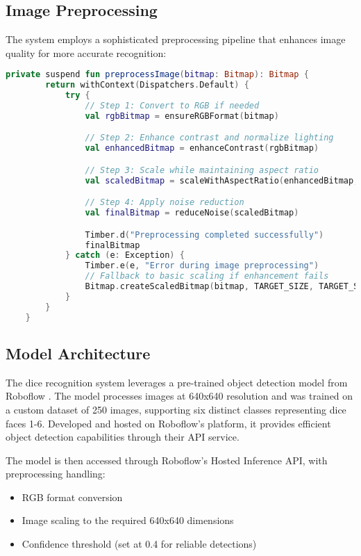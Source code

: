 \subsection{Image Preprocessing}

The system employs a sophisticated preprocessing pipeline that enhances image quality for more accurate recognition:
\begin{lstlisting}[language=Kotlin, caption={Image Preprocessing Pipeline}, label=lst:image_preprocess]
    private suspend fun preprocessImage(bitmap: Bitmap): Bitmap {
        return withContext(Dispatchers.Default) {
            try {
                // Step 1: Convert to RGB if needed
                val rgbBitmap = ensureRGBFormat(bitmap)

                // Step 2: Enhance contrast and normalize lighting
                val enhancedBitmap = enhanceContrast(rgbBitmap)

                // Step 3: Scale while maintaining aspect ratio
                val scaledBitmap = scaleWithAspectRatio(enhancedBitmap, TARGET_SIZE)

                // Step 4: Apply noise reduction
                val finalBitmap = reduceNoise(scaledBitmap)

                Timber.d("Preprocessing completed successfully")
                finalBitmap
            } catch (e: Exception) {
                Timber.e(e, "Error during image preprocessing")
                // Fallback to basic scaling if enhancement fails
                Bitmap.createScaledBitmap(bitmap, TARGET_SIZE, TARGET_SIZE, true)
            }
        }
    }
\end{lstlisting}
\label{lst:image_preprocess}

\subsection{Model Architecture}
The dice recognition system leverages a pre-trained object detection model from Roboflow \cite{bib:kavidataset}. The model processes images at 640x640 resolution and was trained on a custom dataset of 250 images, supporting six distinct classes representing dice faces 1-6. Developed and hosted on Roboflow's platform, it provides efficient object detection capabilities through their API service.

The model is then accessed through Roboflow's Hosted Inference API, with preprocessing handling:
\begin{itemize}
    \item RGB format conversion
    \item Image scaling to the required 640x640 dimensions
    \item Confidence threshold (set at 0.4 for reliable detections)
\end{itemize} 

